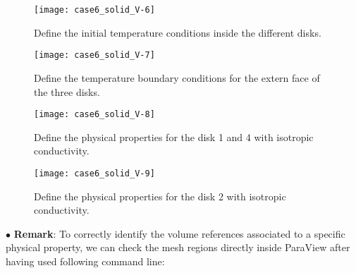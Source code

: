 \begin{figure}[h!]
\begin{center}
\texttt{[image: case6\_solid\_V-6]}
\caption{Define the initial temperature conditions inside the different disks.}
\label{fig1_e5}
\end{center}
\end{figure}

\begin{figure}[h!]
\begin{center}
\texttt{[image: case6\_solid\_V-7]}
\caption{Define the temperature boundary conditions for the extern face of the three disks.}
\label{fig1_e5}
\end{center}
\end{figure}
\newpage

\begin{figure}[h!]
\begin{center}
\texttt{[image: case6\_solid\_V-8]}
\caption{Define the physical properties for the disk 1 and 4 with isotropic conductivity.}
\label{fig1_e5}
\end{center}
\end{figure}

\begin{figure}[h!]
\begin{center}
\texttt{[image: case6\_solid\_V-9]}
\caption{Define the physical properties for the disk 2 with isotropic conductivity.}
\label{fig1_e5}
\end{center}
\end{figure}
$\bullet$ {\bf Remark}: To correctly identify the volume references associated to
a specific physical property, we can check the mesh regions directly inside ParaView after
having used following command line: \\
\newpage

